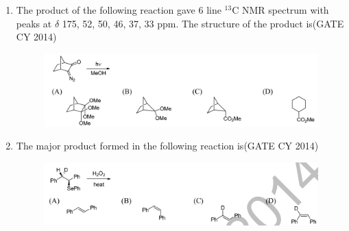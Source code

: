 \documentclass[a4paper,10pt]{exam}
\theoremstyle{remark}
\begin{document}
\begin{enumerate}
\item The product of the following reaction gave 6 line $^{13}$C NMR spectrum with peaks at $\delta$ 175, 52, 50, 
46, 37, 33 ppm. The structure of the product is\hfill{(GATE CY 2014)}
\begin{figure}[H]
    \centering
    \includegraphics[width=0.8\columnwidth]{figs/Q 50.png}
    \caption{}
    \label{fig:placeholder}
\end{figure}
\item The major product formed in the following reaction is\hfill{(GATE CY 2014)}
\begin{figure}[H]
    \centering
    \includegraphics[width=0.8\columnwidth]{figs/Q 51.png}
    \caption{}
    \label{fig:placeholder}
\end{figure}


\end{enumerate}
\end{document}
